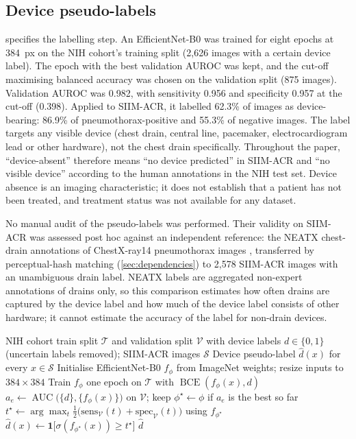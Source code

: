 \documentclass{ieeeaccess}
\DeclareMathOperator{\AUC}{AUC}
\DeclareMathOperator{\BCE}{BCE}
\begin{document}
\subsection{Device pseudo-labels}
\label{sec:pseudo}
 specifies the labelling step. An EfficientNet-B0 \cite{tan2019efficientnet} was trained for eight epochs at 384~px on the NIH cohort's training split (2{,}626 images with a certain device label). The epoch with the best validation AUROC was kept, and the cut-off maximising balanced accuracy was chosen on the validation split (875 images). Validation AUROC was 0.982, with sensitivity 0.956 and specificity 0.957 at the cut-off (0.398). Applied to SIIM-ACR, it labelled 62.3\% of images as device-bearing: 86.9\% of pneumothorax-positive and 55.3\% of negative images. The label targets any visible device (chest drain, central line, pacemaker, electrocardiogram lead or other hardware), not the chest drain specifically. Throughout the paper, ``device-absent'' therefore means ``no device predicted'' in SIIM-ACR and ``no visible device'' according to the human annotations in the NIH test set. Device absence is an imaging characteristic; it does not establish that a patient has not been treated, and treatment status was not available for any dataset.

No manual audit of the pseudo-labels was performed. Their validity on SIIM-ACR was assessed post hoc against an independent reference: the NEATX chest-drain annotations of ChestX-ray14 pneumothorax images \cite{jimenez2023shortcuts}, transferred by perceptual-hash matching (\cref{sec:dependencies}) to 2{,}578 SIIM-ACR images with an unambiguous drain label. NEATX labels are aggregated non-expert annotations of drains only, so this comparison estimates how often drains are captured by the device label and how much of the device label consists of other hardware; it cannot estimate the accuracy of the label for non-drain devices.

\begin{algorithm}[!t]
\caption{Device pseudo-labelling (stage \emph{planb\_prep})}
\label{alg:pseudo}
\begin{algorithmic}[1]
\Require NIH cohort train split $\mathcal{T}$ and validation split $\mathcal{V}$ with device labels $d\in\{0,1\}$ (uncertain labels removed); SIIM-ACR images $\mathcal{S}$
\Ensure Device pseudo-label $\hat d(x)$ for every $x\in\mathcal{S}$
\State Initialise EfficientNet-B0 $f_\phi$ from ImageNet weights; resize inputs to $384\times384$
  \State Train $f_\phi$ one epoch on $\mathcal{T}$ with $\BCE(f_\phi(x),d)$
  \State $a_e \gets \AUC\big(\{d\},\{f_\phi(x)\}\big)$ on $\mathcal{V}$; keep $\phi^\star \gets \phi$ if $a_e$ is the best so far \label{line:pseudo-select}
\EndFor
\State $t^\star \gets \arg\max_t \tfrac12\big(\mathrm{sens}_{\mathcal{V}}(t)+\mathrm{spec}_{\mathcal{V}}(t)\big)$ using $f_{\phi^\star}$ \label{line:pseudo-thr}
  \State $\hat d(x) \gets \mathbf{1}\big[\sigma(f_{\phi^\star}(x)) \ge t^\star\big]$
\EndFor
\State \Return $\hat d$ 
\end{algorithmic}
\end{algorithm}
\end{document}
